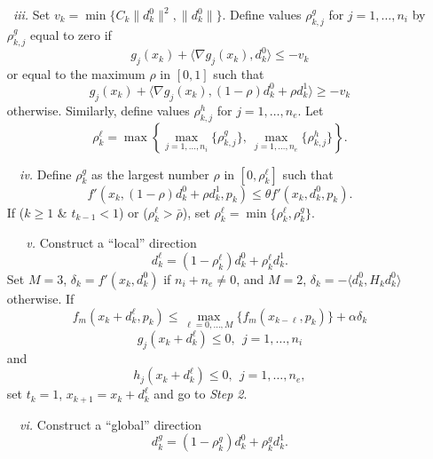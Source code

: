 \begin{itemize}
\item[\it ~iii.] Set $v_{k}=\min \{C_k\|d^0_k\|^2,\|d^0_k\|\}$. 
Define values
$\rho^g_{k,j}$ for $j=1,\ldots,n_i$ by $\rho^g_{k,j}$ equal to zero if
\smallskip
$$g_j(x_k)+\langle \nabla g_j(x_k),d^0_k\rangle \leq -v_k$$
\smallskip
or equal to the maximum $\rho$ in $[0,1]$ such that
\smallskip
$$g_j(x_k)+\langle \nabla g_j(x_k),(1-\rho)d^0_k+
            \rho d^1_k\rangle \geq -v_k$$
\smallskip
otherwise. Similarly, define values $\rho^h_{k,j}$ for $j=1,\ldots,n_e$.
Let $$\rho ^{\ell}_k=\max\left\{\max _{j=1,\ldots,n_i}\{\rho^g_{k,j}\},~
\max _{j=1,\ldots,n_e}\{\rho^h_{k,j}\}\right\}.$$

\item[\it ~~iv.] Define $\rho _k^g$ as the largest number $\rho$
in $[0,\rho ^{\ell}_k]$ such that
\smallskip
$$f'(x_k,(1-\rho)d^0_k+\rho d^1_k,p_k)\leq \theta f'(x_k,d^0_k,p_k).$$
If ($k\geq 1$ \& $t_{k-1}<1$) or ($\rho _k^{\ell} > \bar{\rho}$), set 
$\rho _k^\ell = \min \{\rho _k^\ell, \rho _k^g\}.$

\item[\it ~~~v.] Construct a ``local'' direction
\smallskip
$$d_k^{\ell}=(1-\rho _k^{\ell})d^0_k+\rho _k^{\ell} d^1_k.$$
Set $M=3$, $\delta_k=f'(x_k,d_k^0)$ if $n_i+n_e\ne 0$, 
and $M=2$, $\delta_k=-\langle d_k^0,H_kd_k^0\rangle$ otherwise.
If
$$f_m(x_k+d^{\ell}_k,p_k)\leq 
\max\limits_{\ell=0,\ldots,M}\{f_m(x_{k-\ell},p_k)\} +
       \alpha \delta_k$$
$$g_j(x_k+d^{\ell}_k)\leq 0,~~j=1,\ldots,n_i$$
and
$$h_j(x_k+d^{\ell}_k)\leq 0,~~j=1,\ldots,n_e,$$
\smallskip
set $t_k=1$, $x_{k+1}=x_k+d_k^{\ell}$ and go to {\it Step 2}.

\item[\it ~~vi.] Construct a ``global'' direction
\smallskip
$$d_k^{g}=(1-\rho _k^{g})d^0_k+\rho _k^{g}d^1_k.$$


\end{itemize}
